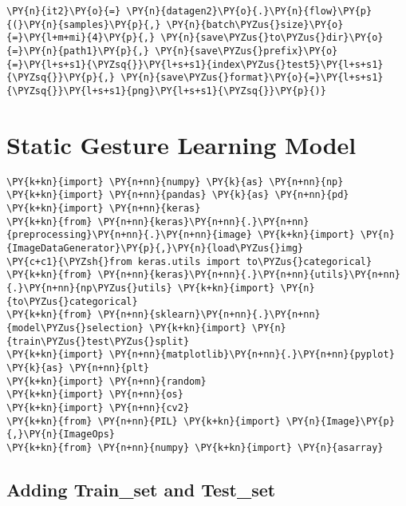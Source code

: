 \begin{tcolorbox}[breakable, size=fbox, boxrule=1pt, pad at break*=1mm,colback=cellbackground, colframe=cellborder]
\begin{Verbatim}[commandchars=\\\{\}]
    \PY{n}{it2}\PY{o}{=} \PY{n}{datagen2}\PY{o}{.}\PY{n}{flow}\PY{p}{(}\PY{n}{samples}\PY{p}{,} \PY{n}{batch\PYZus{}size}\PY{o}{=}\PY{l+m+mi}{4}\PY{p}{,} \PY{n}{save\PYZus{}to\PYZus{}dir}\PY{o}{=}\PY{n}{path1}\PY{p}{,} \PY{n}{save\PYZus{}prefix}\PY{o}{=}\PY{l+s+s1}{\PYZsq{}}\PY{l+s+s1}{index\PYZus{}test5}\PY{l+s+s1}{\PYZsq{}}\PY{p}{,} \PY{n}{save\PYZus{}format}\PY{o}{=}\PY{l+s+s1}{\PYZsq{}}\PY{l+s+s1}{png}\PY{l+s+s1}{\PYZsq{}}\PY{p}{)}
\end{Verbatim}
\end{tcolorbox}

    \hypertarget{static-gesture-learning-model}{%
\section{\texorpdfstring{\textbf{Static Gesture Learning
Model}}{Static Gesture Learning Model}}\label{static-gesture-learning-model}}

    \begin{tcolorbox}[breakable, size=fbox, boxrule=1pt, pad at break*=1mm,colback=cellbackground, colframe=cellborder]
\begin{Verbatim}[commandchars=\\\{\}]
\PY{k+kn}{import} \PY{n+nn}{numpy} \PY{k}{as} \PY{n+nn}{np}
\PY{k+kn}{import} \PY{n+nn}{pandas} \PY{k}{as} \PY{n+nn}{pd}
\PY{k+kn}{import} \PY{n+nn}{keras}
\PY{k+kn}{from} \PY{n+nn}{keras}\PY{n+nn}{.}\PY{n+nn}{preprocessing}\PY{n+nn}{.}\PY{n+nn}{image} \PY{k+kn}{import} \PY{n}{ImageDataGenerator}\PY{p}{,}\PY{n}{load\PYZus{}img}
\PY{c+c1}{\PYZsh{}from keras.utils import to\PYZus{}categorical}
\PY{k+kn}{from} \PY{n+nn}{keras}\PY{n+nn}{.}\PY{n+nn}{utils}\PY{n+nn}{.}\PY{n+nn}{np\PYZus{}utils} \PY{k+kn}{import} \PY{n}{to\PYZus{}categorical}
\PY{k+kn}{from} \PY{n+nn}{sklearn}\PY{n+nn}{.}\PY{n+nn}{model\PYZus{}selection} \PY{k+kn}{import} \PY{n}{train\PYZus{}test\PYZus{}split}
\PY{k+kn}{import} \PY{n+nn}{matplotlib}\PY{n+nn}{.}\PY{n+nn}{pyplot} \PY{k}{as} \PY{n+nn}{plt}
\PY{k+kn}{import} \PY{n+nn}{random}
\PY{k+kn}{import} \PY{n+nn}{os}
\PY{k+kn}{import} \PY{n+nn}{cv2}
\PY{k+kn}{from} \PY{n+nn}{PIL} \PY{k+kn}{import} \PY{n}{Image}\PY{p}{,}\PY{n}{ImageOps}
\PY{k+kn}{from} \PY{n+nn}{numpy} \PY{k+kn}{import} \PY{n}{asarray}  
\end{Verbatim}
\end{tcolorbox}

   \subsection{ Adding Train\_set and Test\_set}


